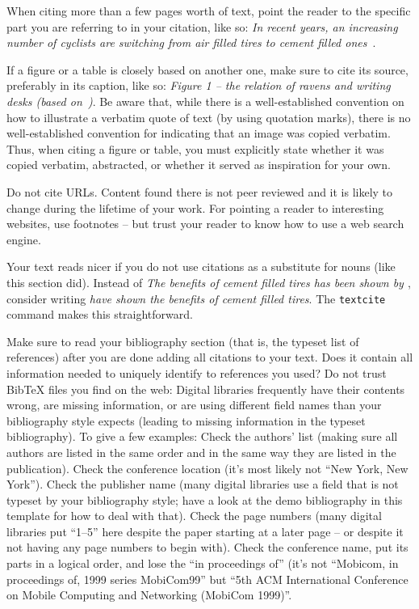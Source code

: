 \documentclass[]{ccs-thesis}
\begin{document}
When citing more than a few pages worth of text, point the reader to the specific part you are referring to in your citation, like so:
\emph{In recent years, an increasing number of cyclists are switching from air filled tires to cement filled ones~\cite[Table IV]{dietrich2009lifetime}}.

If a figure or a table is closely based on another one, make sure to cite its source, preferably in its caption, like so:
\emph{Figure 1 -- the relation of ravens and writing desks (based on~\cite[Figure~42]{dietrich2009lifetime})}.
Be aware that, while there is a well-established convention on how to illustrate a verbatim quote of text (by using quotation marks), there is no well-established convention for indicating that an image was copied verbatim.
Thus, when citing a figure or table, you must explicitly state whether it was copied verbatim, abstracted, or whether it served as inspiration for your own.

Do not cite URLs. Content found there is not peer reviewed and it is likely to change during the lifetime of your work.
For pointing a reader to interesting websites, use footnotes -- but trust your reader to know how to use a web search engine.

Your text reads nicer if you do not use citations as a substitute for nouns (like this section did).
Instead of \emph{The benefits of cement filled tires has been shown by \cite{akyildiz2002survey}}, consider writing \emph{\textcite{akyildiz2002survey} have shown the benefits of cement filled tires}.
The \texttt{textcite} command makes this straightforward.

Make sure to read your bibliography section (that is, the typeset list of references) after you are done adding all citations to your text.
Does it contain all information needed to uniquely identify to references you used?
Do not trust BibTeX files you find on the web:
Digital libraries frequently have their contents wrong, are missing information, or are using different field names than your bibliography style expects (leading to missing information in the typeset bibliography).
To give a few examples:
Check the authors' list (making sure all authors are listed in the same order and in the same way they are listed in the publication).
Check the conference location (it's most likely not ``New York, New York'').
Check the publisher name (many digital libraries use a field that is not typeset by your bibliography style; have a look at the demo bibliography in this template for how to deal with that).
Check the page numbers (many digital libraries put ``1--5'' here despite the paper starting at a later page -- or despite it not having any page numbers to begin with).
Check the conference name, put its parts in a logical order, and lose the ``in proceedings of'' (it's not ``Mobicom, in proceedings of, 1999 series MobiCom99'' but ``5th ACM International Conference on Mobile Computing and Networking (MobiCom 1999)''.
\end{document}
